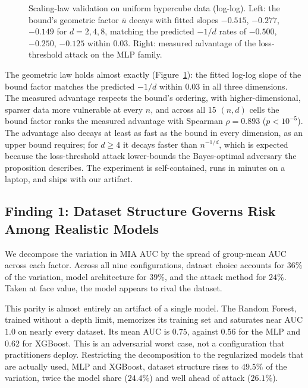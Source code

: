 \begin{figure}[t]
  \centering
  \caption{Scaling-law validation on uniform hypercube data (log-log).
           Left: the bound's geometric factor $\bar{u}$ decays with
           fitted slopes $-0.515$, $-0.277$, $-0.149$ for $d=2,4,8$,
           matching the predicted $-1/d$ rates of $-0.500$, $-0.250$,
           $-0.125$ within $0.03$. Right: measured advantage of the
           loss-threshold attack on the MLP family.}
  \label{fig:tightness}
\end{figure}

The geometric law holds almost exactly (Figure~\ref{fig:tightness}):
the fitted log-log slope of the bound factor matches the predicted
$-1/d$ within $0.03$ in all three dimensions. The measured advantage
respects the bound's ordering, with higher-dimensional, sparser data
more vulnerable at every $n$, and across all 15 $(n,d)$ cells the bound
factor ranks the measured advantage with Spearman $\rho = 0.893$
($p < 10^{-5}$). The advantage also decays at least as fast as the
bound in every dimension, as an upper bound requires; for $d \geq 4$ it
decays faster than $n^{-1/d}$, which is expected because the
loss-threshold attack lower-bounds the Bayes-optimal adversary the
proposition describes. The experiment is self-contained, runs in
minutes on a laptop, and ships with our artifact.

\subsection{Finding 1: Dataset Structure Governs Risk Among Realistic Models}
\label{sec:finding1}

We decompose the variation in MIA AUC by the spread of group-mean AUC across
each factor. Across all nine configurations, dataset choice accounts for
$36\%$ of the variation, model architecture for $39\%$, and the attack
method for $24\%$. Taken at face value, the model appears to rival the
dataset.

This parity is almost entirely an artifact of a single model. The Random
Forest, trained without a depth limit, memorizes its training set and
saturates near AUC $1.0$ on nearly every dataset. Its mean AUC is $0.75$,
against $0.56$ for the MLP and $0.62$ for XGBoost. This is an adversarial
worst case, not a configuration that practitioners deploy. Restricting the
decomposition to the regularized models that are actually used, MLP and
XGBoost, dataset structure rises to $49.5\%$ of the variation, twice the
model share ($24.4\%$) and well ahead of attack ($26.1\%$).

